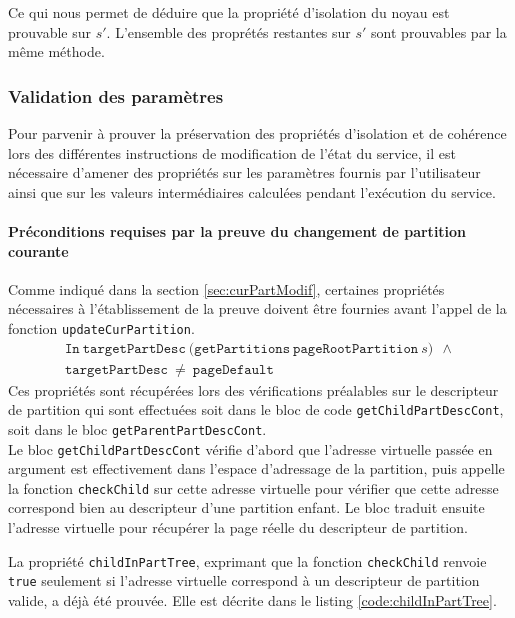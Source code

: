 			Ce qui nous permet de déduire que la propriété d'isolation du noyau est prouvable sur $s'$. L'ensemble des proprétés restantes sur $s'$ sont prouvables par la même méthode.

			\subsubsection{Validation des paramètres}
			Pour parvenir à prouver la préservation des propriétés d'isolation et de cohérence lors des différentes instructions de modification de l'état du service, il est nécessaire d'amener des propriétés sur les paramètres fournis par l'utilisateur ainsi que sur les valeurs intermédiaires calculées pendant l'exécution du service.

			\paragraph{Préconditions requises par la preuve du changement de partition courante}

			Comme indiqué dans la section \ref{sec:curPartModif}, certaines propriétés nécessaires à l'établissement de la preuve doivent être fournies avant l'appel de la fonction \texttt{updateCurPartition}.
			\begin{gather*}
				\mathtt{In~targetPartDesc~(getPartitions~pageRootPartition}~s)~~\wedge\\
				\mathtt{targetPartDesc}~\neq~\mathtt{pageDefault}
			\end{gather*}
			Ces propriétés sont récupérées lors des vérifications préalables sur le descripteur de partition qui sont effectuées soit dans le bloc de code \texttt{getChildPartDescCont}, soit dans le bloc \texttt{getParentPartDescCont}.\\

			Le bloc \texttt{getChildPartDescCont} vérifie d'abord que l'adresse virtuelle passée en argument est effectivement dans l'espace d'adressage de la partition, puis appelle la fonction \texttt{checkChild} sur cette adresse virtuelle pour vérifier que cette adresse correspond bien au descripteur d'une partition enfant. Le bloc traduit ensuite l'adresse virtuelle pour récupérer la page réelle du descripteur de partition.

			La propriété \texttt{childInPartTree}, exprimant que la fonction \texttt{checkChild} renvoie \texttt{true} seulement si l'adresse virtuelle correspond à un descripteur de partition valide, a déjà été prouvée. Elle est décrite dans le listing \ref{code:childInPartTree}.

